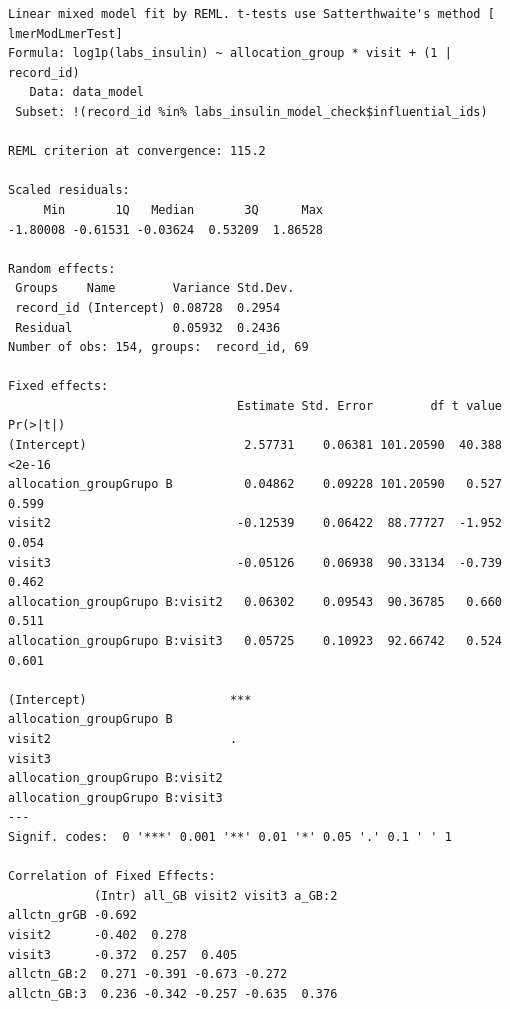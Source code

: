 \documentclass[
  letterpaper,
  DIV=11,
  numbers=noendperiod]{scrartcl}
\newenvironment{Shaded}{\begin{snugshade}}{\end{snugshade}}
\newcommand{\NormalTok}[1]{\textcolor[rgb]{0.00,0.23,0.31}{#1}}
\newcommand{\SpecialCharTok}[1]{\textcolor[rgb]{0.37,0.37,0.37}{#1}}
\begin{document}
\begin{verbatim}
Linear mixed model fit by REML. t-tests use Satterthwaite's method [
lmerModLmerTest]
Formula: log1p(labs_insulin) ~ allocation_group * visit + (1 | record_id)
   Data: data_model
 Subset: !(record_id %in% labs_insulin_model_check$influential_ids)

REML criterion at convergence: 115.2

Scaled residuals: 
     Min       1Q   Median       3Q      Max 
-1.80008 -0.61531 -0.03624  0.53209  1.86528 

Random effects:
 Groups    Name        Variance Std.Dev.
 record_id (Intercept) 0.08728  0.2954  
 Residual              0.05932  0.2436  
Number of obs: 154, groups:  record_id, 69

Fixed effects:
                                Estimate Std. Error        df t value Pr(>|t|)
(Intercept)                      2.57731    0.06381 101.20590  40.388   <2e-16
allocation_groupGrupo B          0.04862    0.09228 101.20590   0.527    0.599
visit2                          -0.12539    0.06422  88.77727  -1.952    0.054
visit3                          -0.05126    0.06938  90.33134  -0.739    0.462
allocation_groupGrupo B:visit2   0.06302    0.09543  90.36785   0.660    0.511
allocation_groupGrupo B:visit3   0.05725    0.10923  92.66742   0.524    0.601
                                  
(Intercept)                    ***
allocation_groupGrupo B           
visit2                         .  
visit3                            
allocation_groupGrupo B:visit2    
allocation_groupGrupo B:visit3    
---
Signif. codes:  0 '***' 0.001 '**' 0.01 '*' 0.05 '.' 0.1 ' ' 1

Correlation of Fixed Effects:
            (Intr) all_GB visit2 visit3 a_GB:2
allctn_grGB -0.692                            
visit2      -0.402  0.278                     
visit3      -0.372  0.257  0.405              
allctn_GB:2  0.271 -0.391 -0.673 -0.272       
allctn_GB:3  0.236 -0.342 -0.257 -0.635  0.376
\end{verbatim}

\begin{Shaded}
\end{Shaded}
\end{document}
